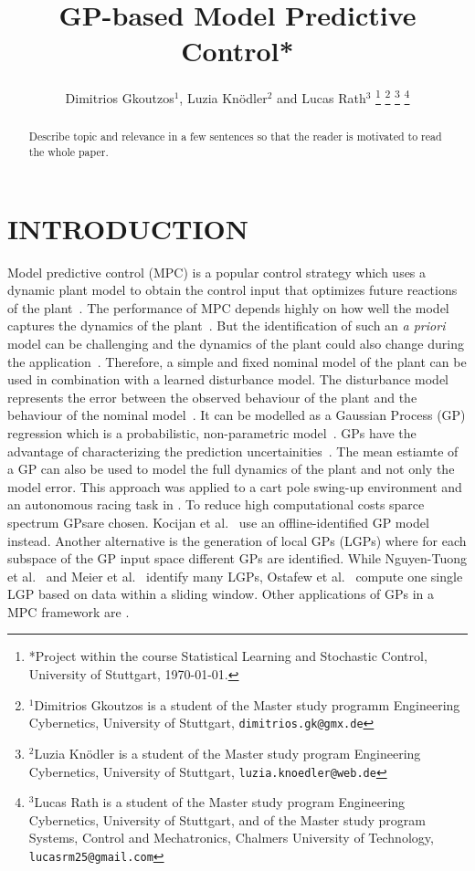 \documentclass[letterpaper, 10 pt, conference]{ieeeconf}  %
\title{\LARGE \bf
GP-based Model Predictive Control*
}
\author{Dimitrios Gkoutzos$^{1}$, Luzia Knödler$^{2}$ and Lucas Rath$^{3}$%
\thanks{*Project within the course Statistical Learning and Stochastic Control, University of Stuttgart, \today.}%
\thanks{$^{1}$Dimitrios Gkoutzos is a student of the Master study programm Engineering Cybernetics, University of Stuttgart,
        {\tt\small dimitrios.gk@gmx.de}}%
\thanks{$^{2}$Luzia Knödler is a student of the Master study program Engineering Cybernetics, University of Stuttgart,
        {\tt\small luzia.knoedler@web.de}}%
\thanks{$^{3}$Lucas Rath is a student of the Master study program Engineering Cybernetics, University of Stuttgart, and of the Master study program Systems, Control and Mechatronics, Chalmers University of Technology,
        {\tt\small lucasrm25@gmail.com}}%
}
\begin{document}
\maketitle
\thispagestyle{empty}
\pagestyle{empty}


\begin{abstract}

Describe topic and relevance in a few sentences so that the reader is motivated to
read the whole paper.

\end{abstract}


\section{INTRODUCTION}
Model predictive control (MPC) is a popular control strategy which uses a dynamic plant model to obtain the control input that optimizes future reactions of the plant~\cite{kocijan2004gaussian}. The performance of MPC depends highly on how well the model captures the dynamics of the plant~\cite{kabzan2019learning}. But the identification of such an \textit{a priori} model can be challenging and the dynamics of the plant could also change during the application~\cite{kabzan2019learning,ostafew2014learning}. Therefore, a simple and fixed nominal model of the plant can be used in combination with a learned disturbance model. The disturbance model represents the error between the observed behaviour of the plant and the behaviour of the nominal model~\cite{ostafew2014learning}. It can be modelled as a Gaussian Process (GP) regression which is a probabilistic, non-parametric model~\cite{kocijan2004gaussian}. GPs have the advantage of characterizing the prediction uncertainities~\cite{kocijan2004gaussian}. The mean estiamte of a GP can also be used to model the full dynamics of the plant and not only the model error. This approach was applied to a cart pole swing-up environment and an autonomous racing task in \cite{van2017online}. To reduce high computational costs sparce spectrum GPsare chosen. Kocijan et al.~\cite{kocijan2004gaussian} use an offline-identified GP model instead. Another alternative is the generation of local GPs (LGPs) where for each subspace of the GP input space different GPs are identified. While Nguyen-Tuong et al.~\cite{nguyen2009local} and Meier et al.~\cite{meier2014efficient} identify many LGPs, Ostafew et al.~\cite{ostafew2014learning} compute one single LGP based on data within a sliding window. Other applications of GPs in a MPC framework are .
\end{document}
